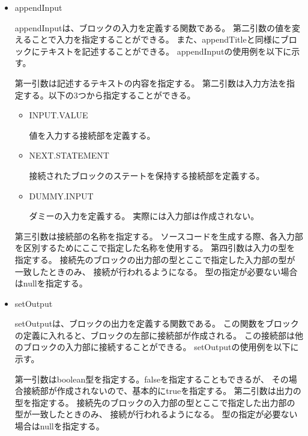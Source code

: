 \documentclass{risepaper}
\begin{document}
\begin{itemize}
\item appendInput


appendInputは、ブロックの入力を定義する関数である。
第二引数の値を変えることで入力を指定することができる。
また、appendTitleと同様にブロックにテキストを記述することができる。
appendInputの使用例を以下に示す。


第一引数は記述するテキストの内容を指定する。
第二引数は入力方法を指定する。以下の3つから指定することができる。

\begin{itemize}
\item INPUT.VALUE

値を入力する接続部を定義する。
\end{itemize}
\begin{itemize}
\item NEXT.STATEMENT

接続されたブロックのステートを保持する接続部を定義する。
\end{itemize}
\begin{itemize}
\item DUMMY.INPUT

ダミーの入力を定義する。
実際には入力部は作成されない。
\end{itemize}

第三引数は接続部の名称を指定する。
ソースコードを生成する際、各入力部を区別するためにここで指定した名称を使用する。
第四引数は入力の型を指定する。
接続先のブロックの出力部の型とここで指定した入力部の型が一致したときのみ、
接続が行われるようになる。
型の指定が必要ない場合はnullを指定する。

\end{itemize}

\begin{itemize}
\item setOutput

setOutputは、ブロックの出力を定義する関数である。
この関数をブロックの定義に入れると、ブロックの左部に接続部が作成される。
この接続部は他のブロックの入力部に接続することができる。
setOutputの使用例を以下に示す。


第一引数はboolean型を指定する。falseを指定することもできるが、
その場合接続部が作成されないので、基本的にtrueを指定する。
第二引数は出力の型を指定する。
接続先のブロックの入力部の型とここで指定した出力部の型が一致したときのみ、
接続が行われるようになる。
型の指定が必要ない場合はnullを指定する。

\end{itemize}
\end{document}
